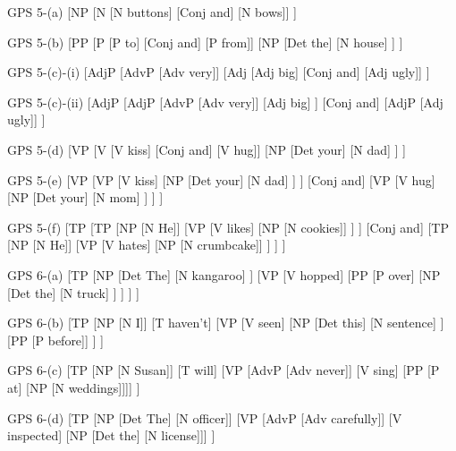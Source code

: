 \documentclass{article}
\begin{document}
\newpage
\noindent
\begin{gpstree}{GPS 5-(a)}
[NP
  [N [N buttons] [Conj and] [N bows]]
]
\end{gpstree}%
\hfill
\begin{gpstree}{GPS 5-(b)}
[PP 
  [P [P to] [Conj and] [P from]]
  [NP 
    [Det the]
    [N house]
  ]
]
\end{gpstree}

\bigskip
\noindent
\begin{gpstree}{GPS 5-(c)-(i)}
[AdjP
  [AdvP [Adv very]]
  [Adj [Adj big] [Conj and] [Adj ugly]]
]
\end{gpstree}
\hfill
\begin{gpstree}{GPS 5-(c)-(ii)}
[AdjP
  [AdjP 
    [AdvP [Adv very]]
    [Adj big]
  ]
  [Conj and]
  [AdjP [Adj ugly]]
]
\end{gpstree}

\bigskip
\noindent
\begin{gpstree}{GPS 5-(d)}
[VP 
  [V [V kiss] [Conj and] [V hug]]
  [NP [Det your]
      [N dad]
  ]
]
\end{gpstree}%
\hfill
\begin{gpstree}{GPS 5-(e)}
[VP
  [VP [V kiss]
      [NP [Det your]
          [N dad]  
      ]
  ]
  [Conj and]
  [VP [V hug]
      [NP [Det your]
          [N mom]
      ] 
  ]  
]
\end{gpstree}

\bigskip
\noindent
\begin{gpstree}{GPS 5-(f)}
[TP
  [TP [NP [N He]]
      [VP [V likes]
          [NP [N cookies]]
      ]
  ]
  [Conj and]
  [TP [NP [N He]]
      [VP [V hates]
          [NP [N crumbcake]]
      ]
  ]
]
\end{gpstree}

\newpage
\noindent
\begin{gpstree}{GPS 6-(a)}
[TP 
  [NP
    [Det The]
    [N kangaroo]
  ]
  [VP 
    [V hopped] 
    [PP 
      [P over]
      [NP [Det the]
          [N truck]
      ]    
    ]
  ]
]
\end{gpstree}%
\hfill
\begin{gpstree}{GPS 6-(b)}
[TP
  [NP [N I]]
  [T haven't]
  [VP [V seen]
      [NP [Det this]
          [N sentence]  
      ]
      [PP [P before]]
  ]
]
\end{gpstree}

\bigskip
\noindent
\begin{gpstree}{GPS 6-(c)}
[TP
  [NP [N Susan]]
  [T will]
  [VP [AdvP [Adv never]] [V sing] [PP [P at] [NP [N weddings]]]]
]
\end{gpstree}
\hfill
\begin{gpstree}{GPS 6-(d)}
[TP
  [NP [Det The] [N officer]]
  [VP [AdvP [Adv carefully]] [V inspected] [NP [Det the] [N license]]]
]
\end{gpstree}
\end{document}
